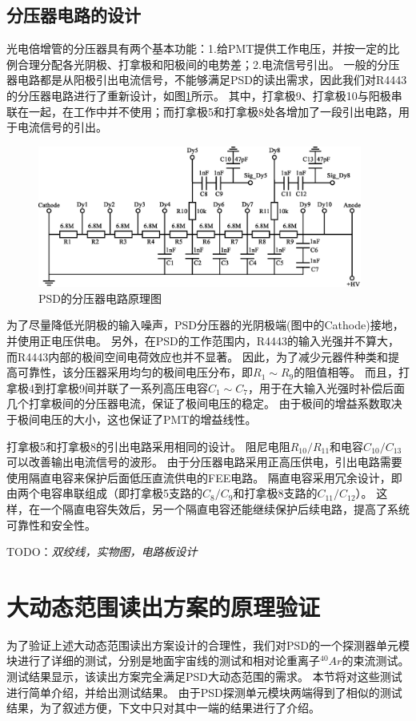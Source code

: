 \subsection{分压器电路的设计}
\label{sec:dynamic_range:hv_divider}
光电倍增管的分压器具有两个基本功能：1.给PMT提供工作电压，并按一定的比例合理分配各光阴极、打拿极和阳极间的电势差；2.电流信号引出。
一般的分压器电路都是从阳极引出电流信号，不能够满足PSD的读出需求，因此我们对R4443的分压器电路进行了重新设计，如图\ref{fig:dynamic_range:divider}所示。
其中，打拿极9、打拿极10与阳极串联在一起，在工作中并不使用；而打拿极5和打拿极8处各增加了一段引出电路，用于电流信号的引出。
\begin{figure}[htbp]
	\centering
	\includegraphics[width=0.95\textwidth]{chap/dynamic_range/fig/divider.eps}
	\caption{PSD的分压器电路原理图}
	\label{fig:dynamic_range:divider}
\end{figure}

为了尽量降低光阴极的输入噪声，PSD分压器的光阴极端(图中的Cathode)接地，并使用正电压供电。
另外，在PSD的工作范围内，R4443的输入光强并不算大，而R4443内部的极间空间电荷效应也并不显著。
因此，为了减少元器件种类和提高可靠性，该分压器采用均匀的极间电压分布，即$R_1 \sim R_9$的阻值相等。
而且，打拿极4到打拿极9间并联了一系列高压电容$C_1 \sim C_7$，用于在大输入光强时补偿后面几个打拿极间的分压器电流，保证了极间电压的稳定。
由于极间的增益系数取决于极间电压的大小，这也保证了PMT的增益线性。

打拿极5和打拿极8的引出电路采用相同的设计。
阻尼电阻$R_{10}/R_{11}$和电容$C_{10}/C_{13}$可以改善输出电流信号的波形。
由于分压器电路采用正高压供电，引出电路需要使用隔直电容来保护后面低压直流供电的FEE电路。
隔直电容采用冗余设计，即由两个电容串联组成（即打拿极5支路的$C_8/C_9$和打拿极8支路的$C_{11}/C_{12}$）。
这样，在一个隔直电容失效后，另一个隔直电容还能继续保护后续电路，提高了系统可靠性和安全性。

TODO：\emph{双绞线，实物图，电路板设计}

\section{大动态范围读出方案的原理验证}
\label{sec:dynamic_range:verification}
为了验证上述大动态范围读出方案设计的合理性，我们对PSD的一个探测器单元模块进行了详细的测试，分别是地面宇宙线的测试和相对论重离子$^{40}Ar$的束流测试。
测试结果显示，该读出方案完全满足PSD大动态范围的需求。
本节将对这些测试进行简单介绍，并给出测试结果。
由于PSD探测单元模块两端得到了相似的测试结果，为了叙述方便，下文中只对其中一端的结果进行了介绍。

